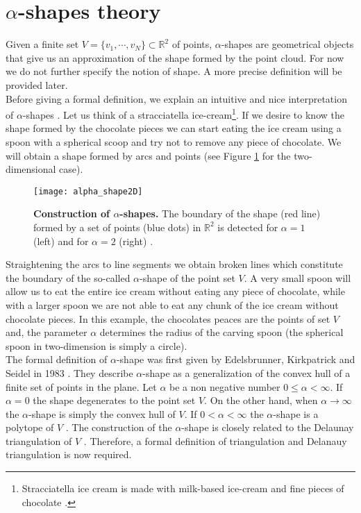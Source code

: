 \section{$\alpha$-shapes theory}\label{sec:alpha-shapes}
Given a finite set $V = \{v_1, \cdots, v_N\}\subset \mathbb{R}^2$ of points, $\alpha$-shapes are geometrical objects that give us an approximation of the shape formed by the point cloud. For now we do not further specify the notion of shape. A more precise definition will be provided later.\\ \indent
Before giving a formal definition, we explain an intuitive and nice interpretation of $\alpha$-shapes \cite{lucieer2004alpha}. 
Let us think of a stracciatella ice-cream\footnote{Stracciatella ice cream is made with milk-based ice-cream and fine pieces of chocolate \cite{Wiki3}.}. If we desire to know the shape formed by the chocolate pieces we can start eating the ice cream using a spoon with a spherical scoop and try not to remove any piece of chocolate. 
We will obtain a shape formed by arcs and points (see Figure \ref{fig:shape2d} for the two-dimensional case).
\begin{figure}[t]\label{fig:shape2d}
\begin{center} 
\texttt{[image: alpha\_shape2D]}
\label{fig:shape}
\caption{\textbf{Construction of $\alpha$-shapes.} The boundary of the shape (red line) formed by a set of points (blue dots) in $\mathbb{R}^2$ is detected for $\alpha = 1$ (left) and for $\alpha=2$ (right) \cite{sabel2017application}.}
\label{fig:shape2d}
\end{center}
\end{figure}
Straightening the arcs to line segments we obtain broken lines which constitute the boundary of the so-called $\alpha$-shape of the point set $V$. 
A very small spoon will allow us to eat the entire ice cream without eating any piece of chocolate, while with a larger spoon we are not able to eat any chunk of the ice cream without chocolate pieces. In this example, the chocolates peaces are the points of set $V$ and, the parameter $\alpha$ determines the radius of the carving spoon (the spherical spoon in two-dimension is simply a circle).\\ \indent 
The formal definition of $\alpha$-shape was first given by Edelsbrunner, Kirkpatrick and Seidel in 1983 \cite{edelsbrunner1983shape}. They describe $\alpha$-shape as a generalization of the convex hull of a finite set of points in the plane. Let $\alpha$ be a non negative number $0\leq\alpha<\infty$. 
If $\alpha = 0$ the shape degenerates to the point set $V$. On the other hand, when $\alpha\rightarrow\infty$ the $\alpha$-shape is simply the convex hull of $V$. If $0<\alpha<\infty$ the $\alpha$-shape is a polytope of $V$ \cite{edelsbrunner1994three}. The construction of the $\alpha$-shape is closely related to the Delaunay triangulation of $V$ \cite{mucke1993shapes}. Therefore, a formal definition of triangulation and Delanauy triangulation is now required. \\ \indent
